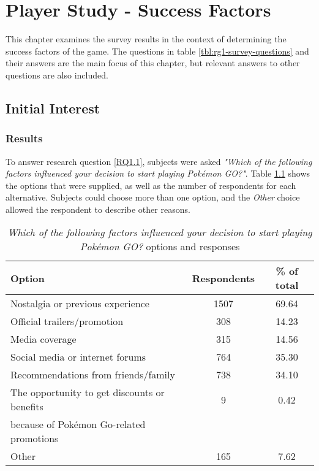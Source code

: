 
\chapter{Player Study - Success Factors}

This chapter examines the survey results in the context of determining the success factors of the game. The questions in table \ref{tbl:rg1-survey-questions} and their answers are the main focus of this chapter, but relevant answers to other questions are also included.

\section{Initial Interest}
\label{sec:success-factors-initial-interest}


\subsection{Results}

To answer research question \ref{RQ1.1}, subjects were asked \emph{"Which of the following factors influenced your decision to start playing Pokémon GO?"}. Table \ref{tbl:initial-interest-options} shows the options that were supplied, as well as the number of respondents for each alternative. Subjects could choose more than one option, and the \emph{Other} choice allowed the respondent to describe other reasons.

\begin{table}[h]
	\caption{\emph{Which of the following factors influenced your decision to start playing Pokémon GO?} options and responses}
	\centering
	\label{tbl:initial-interest-options}
	\begin{tabular}{|l|c|c|}
		\hline
		\textbf{Option} & \textbf{Respondents} & \textbf{\% of total}\\
		\hline\hline
		Nostalgia or previous experience & 1507 & 69.64\\\hline
		Official trailers/promotion & 308 & 14.23\\\hline
		Media coverage & 315 & 14.56\\\hline
		Social media or internet forums & 764 & 35.30\\\hline
		Recommendations from friends/family & 738 & 34.10\\\hline
		The opportunity to get discounts or benefits & 9 & 0.42\\ because of Pokémon Go-related promotions && \\\hline
		Other & 165 & 7.62\\\hline
	\end{tabular}
\end{table}

